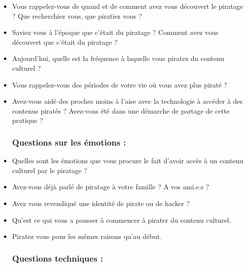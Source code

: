          \begin{itemize}

         \subsubsection*{Histoire personnelle :}
         
             \item Vous rappelez-vous de quand et de comment avez vous découvert le piratage ? Que recherchiez vous, que piratiez vous ?

            \item Saviez vous à l'époque que c'était du piratage ? Comment avez vous découvert que c'était du piratage ?

            \item Aujourd'hui, quelle est la fréquence à laquelle vous piratez du contenu culturel ?

            \item Vous rappelez-vous des périodes de votre vie où vous avez plus piraté ?
             
            \item Avez-vous aidé des proches moins à l'aise avec la technologie à accéder à des contenus piratés ? Avez-vous été dans une démarche de partage de cette pratique ?

        \subsubsection*{Questions sur les émotions :}
        
            \item Quelles sont les émotions que vous procure le fait d'avoir accès à un contenu culturel par le piratage ?

            \item Avez-vous déjà parlé de piratage à votre famille ? A vos ami.e.s ?

            \item Avez vous revendiqué une identité de pirate ou de hacker ?

            \item Qu'est ce qui vous a pousser à commencer à pirater du contenu culturel.
            
            \item Piratez vous pour les mêmes raisons qu'au début. 

        \subsubsection*{Questions techniques :}
        

\end{itemize}

